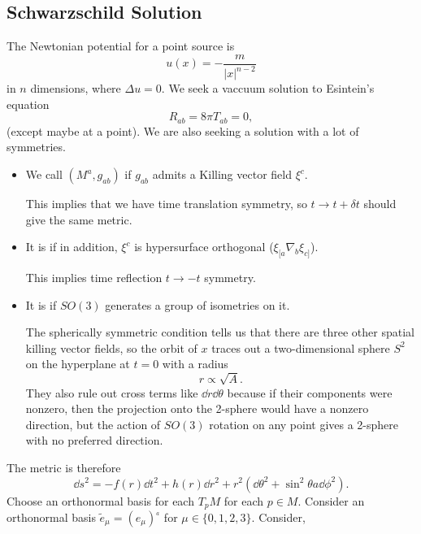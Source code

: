 \documentclass{article}
\numberwithin{equation}{section}
\begin{document}
\subsection{Schwarzschild Solution}
The Newtonian potential for a point source is 
\begin{equation*}
    u(x) = - \frac{m}{|x|^{n-2}}
\end{equation*}
in $n$ dimensions, where $\Delta u = 0.$ We seek a vaccuum solution to Esintein's equation 
\begin{equation*}
    R_{ab} = 8\pi T_{ab} = 0,
\end{equation*}
(except maybe at a point). We are also seeking a solution with a lot of symmetries.
\begin{itemize}
    \item We call $(M^a,g_{ab})$  if $g_{ab}$ admits a Killing vector field $\xi^c$.
    
    This implies that we have time translation symmetry, so $t \to t + \delta t$ should give the same metric.
    \item It is  if in addition, $\xi^c$ is hypersurface orthogonal ($\xi_{[a}\nabla_b\xi_{c]}$).
    
    This implies time reflection $t \to -t$ symmetry.
    \item It is  if $SO(3)$ generates a group of isometries on it.
    
    The spherically symmetric condition tells us that there are three other spatial killing vector fields, so the orbit of $x$ traces out a two-dimensional sphere $S^2$ on the hyperplane at $t=0$ with a radius 
    \begin{equation*}
        r \propto \sqrt{A}.
    \end{equation*}
    They also rule out cross terms like $\dd{r}\dd{\theta}$ because if their components were nonzero, then the projection onto the 2-sphere would have a nonzero direction, but the action of $SO(3)$ rotation on any point gives a 2-sphere with no preferred direction.
\end{itemize}
 The metric is therefore 
\begin{equation*}
    \dd{s}^2 = -f(r)\dd{t}^2 + h(r)\dd{r}^2 + r^2\left(\dd{\theta}^2 + \sin^2\theta a\dd{\phi}^2\right).
\end{equation*}
 Choose an orthonormal basis for each $T_{p}M$ for each $p\in M.$ Consider an orthonormal basis $\tilde{e}_{\mu} = (e_\mu)^{_a}$ for $\mu \in \{0,1,2,3\}.$ Consider,
\end{document}
